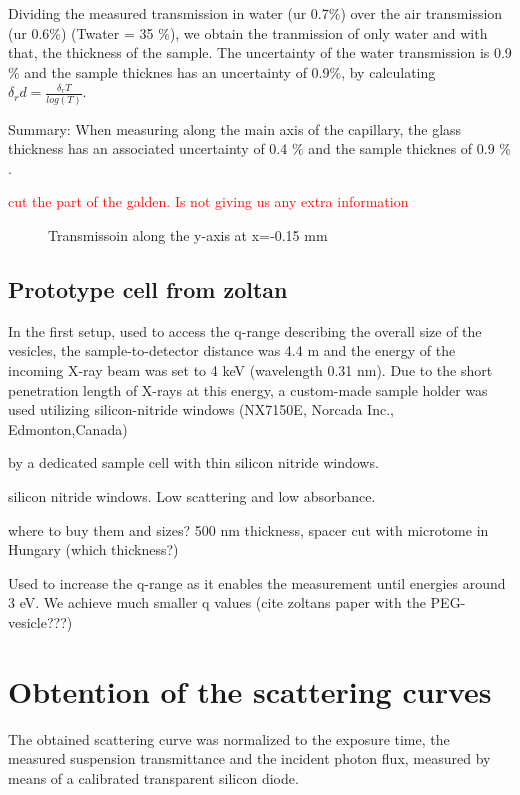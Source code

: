 Dividing the measured transmission in water (ur 0.7$\%$) over the air transmission (ur 0.6$\%$) (Twater = 35 $\%$), we obtain the tranmission of only water and with that, the thickness of the sample. The uncertainty of the water transmission is 0.9 $\%$ and the sample thicknes has an uncertainty of 0.9$\%$, by calculating $\delta_r d = \frac{\delta_r T}{log(T)}$.

Summary: When measuring along the main axis of the capillary, the glass thickness has an associated uncertainty of 0.4 $\%$ and the sample thicknes of 0.9 $\%$.

\textcolor{red}{cut the part of the galden. Is not giving us any extra information}

\begin{figure}%
	\centering
		
		\caption{Transmissoin along the y-axis at x=-0.15 mm}
		\label{fig:GaldenCalibration}
\end{figure}

\subsection{Prototype cell from zoltan}

In the first setup, used to access the q-range describing the overall size of the vesicles, the sample-to-detector distance was 4.4 m and the energy of the incoming X-ray beam was set to 4 keV (wavelength 0.31 nm). Due to the short penetration length of X-rays at this energy, a custom-made sample holder was used utilizing silicon-nitride windows (NX7150E, Norcada Inc., Edmonton,Canada)

by a dedicated sample cell with thin silicon nitride windows. 

silicon nitride windows. Low scattering and low absorbance. 

where to buy them and sizes? 500 nm thickness, spacer cut with microtome in Hungary (which thickness?)

Used to increase the q-range as it enables the measurement until energies around 3 eV. We achieve much smaller q values (cite zoltans paper with the PEG-vesicle???)

\section{Obtention of the scattering curves}

The obtained scattering curve was normalized to the exposure time, the measured suspension transmittance and the incident photon flux, measured by means of a calibrated transparent silicon diode. 

